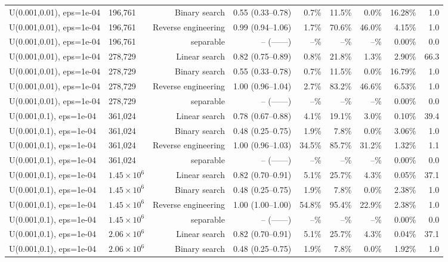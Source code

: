 \begin{tabular}{llrrrrrrr}
U(0.001,0.01), eps=1e-04 & 196,761 & Binary search & 0.55 (0.33--0.78) & 0.7\% & 11.5\% & 0.0\% & 16.28\% & 1.0 \\
U(0.001,0.01), eps=1e-04 & 196,761 & Reverse engineering & 0.99 (0.94--1.06) & 1.7\% & 70.6\% & 46.0\% & 4.15\% & 1.0 \\
U(0.001,0.01), eps=1e-04 & 196,761 & separable & -- (------) & --\% & --\% & --\% & 0.00\% & 0.0 \\
U(0.001,0.01), eps=1e-04 & 278,729 & Linear search & 0.82 (0.75--0.89) & 0.8\% & 21.8\% & 1.3\% & 2.90\% & 66.3 \\
U(0.001,0.01), eps=1e-04 & 278,729 & Binary search & 0.55 (0.33--0.78) & 0.7\% & 11.5\% & 0.0\% & 16.79\% & 1.0 \\
U(0.001,0.01), eps=1e-04 & 278,729 & Reverse engineering & 1.00 (0.96--1.04) & 2.7\% & 83.2\% & 46.6\% & 6.53\% & 1.0 \\
U(0.001,0.01), eps=1e-04 & 278,729 & separable & -- (------) & --\% & --\% & --\% & 0.00\% & 0.0 \\
U(0.001,0.1), eps=1e-04 & 361,024 & Linear search & 0.78 (0.67--0.88) & 4.1\% & 19.1\% & 3.0\% & 0.10\% & 39.4 \\
U(0.001,0.1), eps=1e-04 & 361,024 & Binary search & 0.48 (0.25--0.75) & 1.9\% & 7.8\% & 0.0\% & 3.06\% & 1.0 \\
U(0.001,0.1), eps=1e-04 & 361,024 & Reverse engineering & 1.00 (0.96--1.03) & 34.5\% & 85.7\% & 31.2\% & 1.32\% & 1.1 \\
U(0.001,0.1), eps=1e-04 & 361,024 & separable & -- (------) & --\% & --\% & --\% & 0.00\% & 0.0 \\
U(0.001,0.1), eps=1e-04 & $1.45\times 10^{6}$ & Linear search & 0.82 (0.70--0.91) & 5.1\% & 25.7\% & 4.3\% & 0.05\% & 37.1 \\
U(0.001,0.1), eps=1e-04 & $1.45\times 10^{6}$ & Binary search & 0.48 (0.25--0.75) & 1.9\% & 7.8\% & 0.0\% & 2.38\% & 1.0 \\
U(0.001,0.1), eps=1e-04 & $1.45\times 10^{6}$ & Reverse engineering & 1.00 (1.00--1.00) & 54.8\% & 95.4\% & 22.9\% & 2.38\% & 1.0 \\
U(0.001,0.1), eps=1e-04 & $1.45\times 10^{6}$ & separable & -- (------) & --\% & --\% & --\% & 0.00\% & 0.0 \\
U(0.001,0.1), eps=1e-04 & $2.06\times 10^{6}$ & Linear search & 0.82 (0.70--0.91) & 5.1\% & 25.7\% & 4.3\% & 0.04\% & 37.1 \\
U(0.001,0.1), eps=1e-04 & $2.06\times 10^{6}$ & Binary search & 0.48 (0.25--0.75) & 1.9\% & 7.8\% & 0.0\% & 1.92\% & 1.0 \\

\end{tabular}
